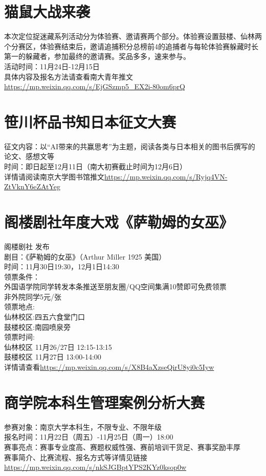 \documentclass[letterpaper, 12pt]{article}
\begin{document}
\begin{multicols}{2}
\section{猫鼠大战来袭}
本次定位捉迷藏系列活动分为体验赛、邀请赛两个部分。体验赛设置鼓楼、仙林两个分赛区，体验赛结束后，邀请追捕积分总榜前4的追捕者与每轮体验赛躲藏时长第一的躲藏者，参加最终的邀请赛。奖品多多，速来参与。\\
活动时间：11月24日-12月15日\\
具体内容及报名方法请查看南大青年推文\url{https://mp.weixin.qq.com/s/EjGSzmp5_EX2i-80om6prQ}\\
\section{笹川杯品书知日本征文大赛}
征文内容：以“AI带来的共赢思考”为主题，阅读各类与日本相关的图书后撰写的论文、感想文等\\
时间：即日起至12月11日（南大初赛截止时间为12月6日）\\
详情请阅读南京大学图书馆推文\url{https://mp.weixin.qq.com/s/Ryjq4VN-ZtVknY6eZAtYeg}\\

\section{阁楼剧社年度大戏《萨勒姆的女巫》}
阁楼剧社 发布\\
剧目：《萨勒姆的女巫》（Arthur Miller 1925 美国）\\
时间：11月30日19:30，12月1日14:30\\
领票条件：\\
外国语学院同学转发本条推送至朋友圈/QQ空间集满10赞即可免费领票\\
非外院同学5元/张\\
领票地点:\\
仙林校区:四五六食堂门口\\
鼓楼校区:南园喷泉旁\\
领票时间:\\
仙林校区 11月26/27日 12:15-13:15\\
鼓楼校区 11月27日 13:00-14:00\\
详情请查看\url{https://mp.weixin.qq.com/s/X8B4aXzseQirU8yi0c5Iyw}\\

\section{商学院本科生管理案例分析大赛}
参赛对象：南京大学本科生，不限专业、不限年级\\
报名时间：11月22日（周五）-11月25日（周一）18:00\\
赛事亮点：赛事专业度高、赛题权威性强、赛前培训干货足、赛事奖励丰厚\\
赛事简介、比赛流程、报名方式等详情见链接\url{https://mp.weixin.qq.com/s/nkSJGBptYPS2KYz0ksop0w}


\end{multicols}
\end{document}
